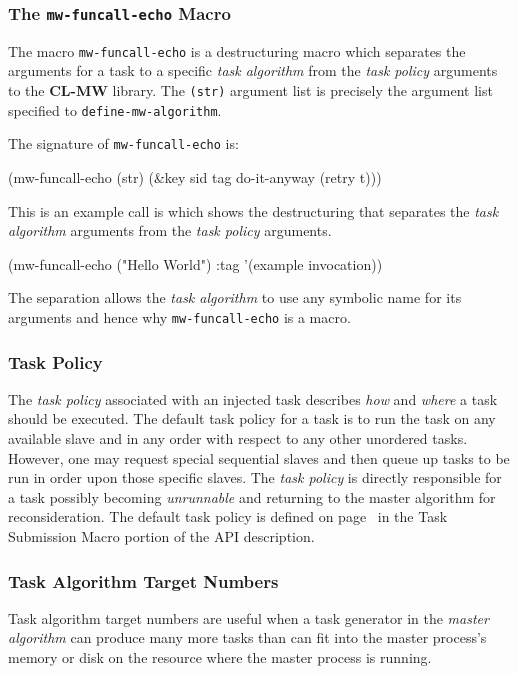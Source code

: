 \documentclass[titlepage,12pt]{book}
\newcommand{\xsmall}{\latexhtml{\small}{}}
\newcommand{\xnormalsize}{\latexhtml{\normalsize}{}}
\newcommand{\clmw}{\xsmall\textbf{CL-MW}\xnormalsize\xspace}
\newcommand{\ma}{\textit{master algorithm}\xspace}
\newcommand{\ta}{\textit{task algorithm}\xspace}
\newcommand{\tp}{\textit{task policy}\xspace}
\newcommand{\macro}[1]{\xsmall\mbox{\uppercase{\texttt{#1}}}\xnormalsize\xspace}
\begin{document}
\subsubsection{The \macro{mw-funcall-echo} Macro}

The macro \macro{mw-funcall-echo} is a destructuring macro which
separates the arguments for a task to a specific \ta from the \tp
arguments to the \clmw library.  The \texttt{(str)} argument list is
precisely the argument list specified to \macro{define-mw-algorithm}.

The signature of \macro{mw-funcall-echo} is:

\begin{barelisp}
(mw-funcall-echo (str) 
                 (&key sid tag do-it-anyway (retry t)))
\end{barelisp}

This is an example call is which shows the destructuring that separates
the \ta arguments from the \tp arguments. 

\begin{barelisp}
(mw-funcall-echo ("Hello World") 
                 :tag '(example invocation))
\end{barelisp}

The separation allows the \ta to use any symbolic name for its
arguments and hence why \macro{mw-funcall-echo} is a macro.

\subsubsection{Task Policy}

The \tp associated with an injected task describes \emph{how} and
\emph{where} a task should be executed.  The default task policy for
a task is to run the task on any available slave and in any order
with respect to any other unordered tasks. However, one may request
special sequential slaves and then queue up tasks to be run in order
upon those specific slaves.  The \tp is directly responsible for a
task possibly becoming \emph{unrunnable} and returning to the master
algorithm for reconsideration.  The default task policy is defined
on page~\pageref{task-policy} in the Task Submission Macro portion
of the API description.

\subsubsection{Task Algorithm Target Numbers}

Task algorithm target numbers are useful when a task generator in the \ma
can produce many more tasks than can fit into the master process's
memory or disk on the resource where the master process is running.
\end{document}
